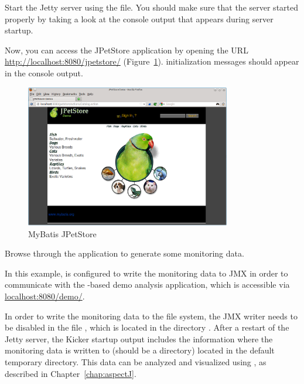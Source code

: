 \begin{compactenum}
\item Start the Jetty server using the  file. You should make %
   sure that the server started properly by taking a look at %
   the console output that appears during server startup.  
\item Now, you can access the JPetStore application by opening the URL
   \url{http://localhost:8080/jpetstore/} (Figure~\ref{fig:jpetstore}). %
   \Kicker{} initialization messages should appear in the console output. %
   
\begin{figure}[h]\centering
\includegraphics[width=0.8\textwidth]{images/jpetstore-example-FFscrsh}
\caption{MyBatis JPetStore}\label{fig:jpetstore}%
\end{figure}
   
\item   Browse through the application to generate some monitoring data. %
\item In this example, \Kicker{} is configured to write the monitoring data %
      to JMX in order to communicate with the \Kicker-based demo analysis %
      application, which is accessible via \url{localhost:8080/demo/}.
   
\item In order to write the monitoring data to the file system, the %
      JMX writer needs to be disabled in the file , %
      which is located in the directory .
      After a restart of the Jetty server, the Kicker startup output includes the %
      information where the monitoring data is written to (should be a %
       directory) located in the default temporary %
      directory. %
   This data can be analyzed and visualized using \KickerTraceAnalysis{}, %
   as described in Chapter~\ref{chap:aspectJ}.
\end{compactenum}

\medskip

 